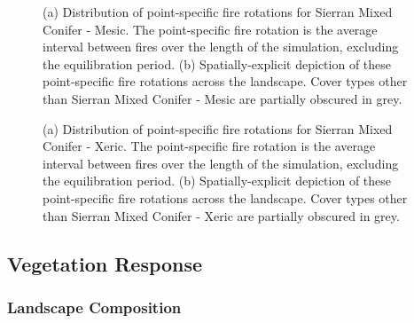 \begin{figure}[!htbp]
  \centering
  \caption{(a) Distribution of point-specific fire rotations for Sierran Mixed Conifer - Mesic. The point-specific fire rotation is the average interval between fires over the length of the simulation, excluding the equilibration period. (b) Spatially-explicit depiction of these point-specific fire rotations across the landscape. Cover types other than Sierran Mixed Conifer - Mesic are partially obscured in grey.}
\label{fig:preturn_smcm}
\end{figure}

\begin{figure}[!htbp]
  \centering
  \caption{(a) Distribution of point-specific fire rotations for Sierran Mixed Conifer - Xeric. The point-specific fire rotation is the average interval between fires over the length of the simulation, excluding the equilibration period. (b) Spatially-explicit depiction of these point-specific fire rotations across the landscape. Cover types other than Sierran Mixed Conifer - Xeric are partially obscured in grey.}
\label{fig:preturn_smcx}
\end{figure}

\clearpage



\subsection{Vegetation Response}
\label{subsec:HRVvegresponse}


\subsubsection{Landscape Composition} 

